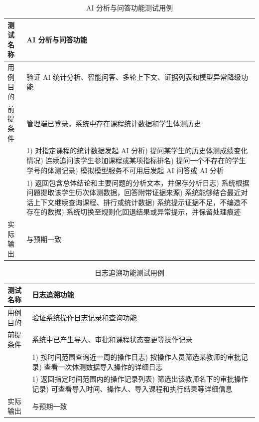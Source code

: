 \begin{table}[H]
  \centering
  \caption{AI 分析与问答功能测试用例}
  \label{tab:tc-ai}
  \footnotesize
  \renewcommand{\arraystretch}{1.35}
  \begin{tabularx}{\textwidth}{|L{2.4cm}|X|}
    \hline
    测试名称 & AI 分析与问答功能 \\
    \hline
    用例目的 & 验证 AI 统计分析、智能问答、多轮上下文、证据列表和模型异常降级功能 \\
    \hline
    前提条件 & 管理端已登录，系统中存在课程统计数据和学生体测历史 \\
    \hline
     &
      1) 对指定课程的统计数据发起 AI 分析) 提问某学生的历史体测成绩变化情况) 连续追问该学生参加课程或某项指标排名) 提问一个不存在的学生学号的体测记录) 模拟模型服务不可用后发起 AI 问答或 AI 分析 \\
    \hline
     &
      1) 返回包含总体结论和主要问题的分析文本，并保存分析日志) 系统根据问题提取该学生历次体测数据，回答附带证据来源) 系统能够结合最近对话上下文继续查询课程、排行或统计数据) 系统提示证据不足，不编造不存在的数据) 系统切换至规则化回退结果或异常提示，并保留处理痕迹 \\
    \hline
    实际输出 & 与预期一致 \\
    \hline
  \end{tabularx}
\end{table}

\begin{table}[H]
  \centering
  \caption{日志追溯功能测试用例}
  \label{tab:tc-log}
  \footnotesize
  \renewcommand{\arraystretch}{1.35}
  \begin{tabularx}{\textwidth}{|L{2.4cm}|X|}
    \hline
    测试名称 & 日志追溯功能 \\
    \hline
    用例目的 & 验证系统操作日志记录和查询功能 \\
    \hline
    前提条件 & 系统中已产生导入、审批和课程状态变更等操作记录 \\
    \hline
     &
      1) 按时间范围查询近一周的操作日志) 按操作人员筛选某教师的审批记录) 查看一次体测数据导入操作的详细日志 \\
    \hline
     &
      1) 返回指定时间范围内的操作记录列表) 筛选出该教师名下的审批操作记录) 可查看导入时间、操作人、导入课程和执行结果等详细信息 \\
    \hline
    实际输出 & 与预期一致 \\
    \hline
  \end{tabularx}
\end{table}

